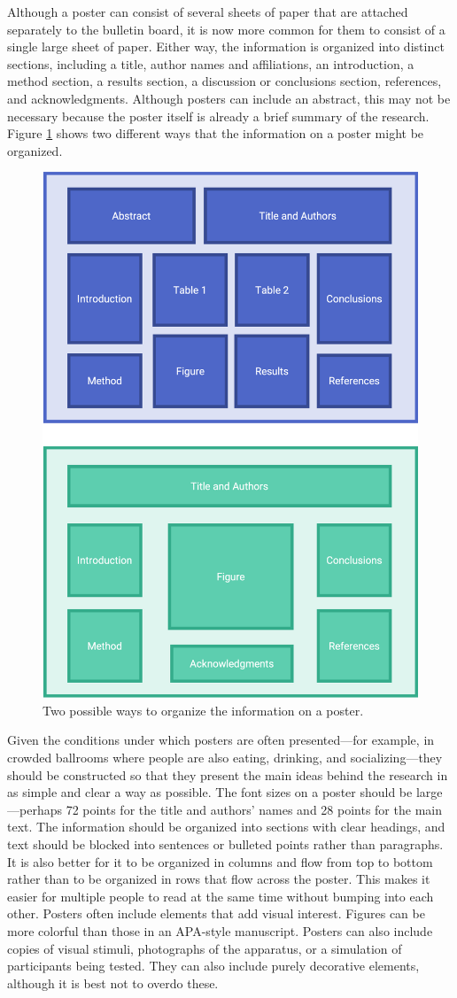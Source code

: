 \documentclass[
]{krantz}
\begin{document}
Although a poster can consist of several sheets of paper that are attached separately to the bulletin board, it is now more common for them to consist of a single large sheet of paper. Either way, the information is organized into distinct sections, including a title, author names and affiliations, an introduction, a method section, a results section, a discussion or conclusions section, references, and acknowledgments. Although posters can include an abstract, this may not be necessary because the poster itself is already a brief summary of the research. Figure \ref{fig:posterorg} shows two different ways that the information on a poster might be organized.

\begin{figure}

{\centering \includegraphics[width=0.6\linewidth]{images/ch11/posterorg} 

}

\caption{Two possible ways to organize the information on a poster.}\label{fig:posterorg}
\end{figure}

Given the conditions under which posters are often presented---for example, in crowded ballrooms where people are also eating, drinking, and socializing---they should be constructed so that they present the main ideas behind the research in as simple and clear a way as possible. The font sizes on a poster should be large---perhaps 72 points for the title and authors' names and 28 points for the main text. The information should be organized into sections with clear headings, and text should be blocked into sentences or bulleted points rather than paragraphs. It is also better for it to be organized in columns and flow from top to bottom rather than to be organized in rows that flow across the poster. This makes it easier for multiple people to read at the same time without bumping into each other. Posters often include elements that add visual interest. Figures can be more colorful than those in an APA-style manuscript. Posters can also include copies of visual stimuli, photographs of the apparatus, or a simulation of participants being tested. They can also include purely decorative elements, although it is best not to overdo these.
\end{document}

